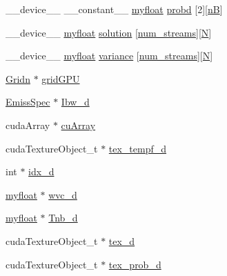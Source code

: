 \begin{DoxyCompactItemize}
\item 
\+\_\+\+\_\+device\+\_\+\+\_\+ \+\_\+\+\_\+constant\+\_\+\+\_\+ \hyperlink{param_8h_a5f097c9f3873af7be7fc156e6a06ca5e}{myfloat} \hyperlink{mc__gpu_8cu_a131af82a244f87ed47b51923130d1dd8}{probd} \mbox{[}2\mbox{]}\mbox{[}\hyperlink{NarrowBand_8h_aca13f491975ccaa9a165708a85753bda}{nB}\mbox{]}
\item 
\+\_\+\+\_\+device\+\_\+\+\_\+ \hyperlink{param_8h_a5f097c9f3873af7be7fc156e6a06ca5e}{myfloat} \hyperlink{mc__gpu_8cu_afcb028a3164fe9ad50b60635222ffd5b}{solution} \mbox{[}\hyperlink{param_8h_ad38ac11e843c3ad8714da6e5599cd1fb}{num\+\_\+streams}\mbox{]}\mbox{[}\hyperlink{mc__gpu_8cu_ab2b6b0c222cd1ce70d6a831f57241e59}{N}\mbox{]}
\item 
\+\_\+\+\_\+device\+\_\+\+\_\+ \hyperlink{param_8h_a5f097c9f3873af7be7fc156e6a06ca5e}{myfloat} \hyperlink{mc__gpu_8cu_aaf52a34d721b2c600e332ffc78a8ee68}{variance} \mbox{[}\hyperlink{param_8h_ad38ac11e843c3ad8714da6e5599cd1fb}{num\+\_\+streams}\mbox{]}\mbox{[}\hyperlink{mc__gpu_8cu_ab2b6b0c222cd1ce70d6a831f57241e59}{N}\mbox{]}
\item 
\hyperlink{classGridn}{Gridn} $\ast$ \hyperlink{mc__gpu_8cu_a74de1e808220d77a904a4dd5835cdead}{grid\+G\+PU}
\item 
\hyperlink{structEmissSpec}{Emiss\+Spec} $\ast$ \hyperlink{mc__gpu_8cu_ae0d8a42c87785ba8b4a1792ff67ab599}{Ibw\+\_\+d}
\item 
cuda\+Array $\ast$ \hyperlink{mc__gpu_8cu_a291eae07ae1ee742a6aafd844ed9f7ef}{cu\+Array}
\item 
cuda\+Texture\+Object\+\_\+t $\ast$ \hyperlink{mc__gpu_8cu_aff98f241432bdd0d6a9caccb19426859}{tex\+\_\+tempf\+\_\+d}
\item 
int $\ast$ \hyperlink{mc__gpu_8cu_a0092894182b745f3aaa00baacf024329}{idx\+\_\+d}
\item 
\hyperlink{param_8h_a5f097c9f3873af7be7fc156e6a06ca5e}{myfloat} $\ast$ \hyperlink{mc__gpu_8cu_a64cbc4394e0b9bd53897ba9c9fb88fc4}{wvc\+\_\+d}
\item 
\hyperlink{param_8h_a5f097c9f3873af7be7fc156e6a06ca5e}{myfloat} $\ast$ \hyperlink{mc__gpu_8cu_a1cf79772104f5b8b803bcbf4c6b5a053}{Tnb\+\_\+d}
\item 
cuda\+Texture\+Object\+\_\+t $\ast$ \hyperlink{mc__gpu_8cu_ad5c4d0a58301ccacad07ee3641a693b8}{tex\+\_\+d}
\item 
cuda\+Texture\+Object\+\_\+t $\ast$ \hyperlink{mc__gpu_8cu_af5760f0df5d9e1fdc7eb6c8ff7ef978d}{tex\+\_\+prob\+\_\+d}
\end{DoxyCompactItemize}


